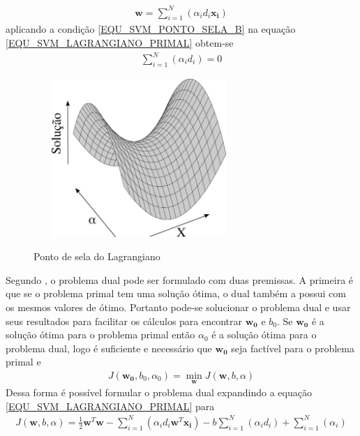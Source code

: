 \begin{align}
\mathbf{w} = \sum\limits_{i = 1}^{N} \left( \alpha_{i}d_{i}\mathbf{x_{i}} \right) \label{EQU_SVM_PONTO_SELA_W_RESTRICAO_OBTIDA}
\end{align}
aplicando a condição \eqref{EQU_SVM_PONTO_SELA_B} na equação \eqref{EQU_SVM_LAGRANGIANO_PRIMAL} obtem-se 
\begin{align}
\sum\limits_{i=1}^{N} \left( \alpha_{i}d_{i} \right) = 0 \label{EQU_SVM_PONTO_SELA_B_RESTRICAO_OBTIDA}
\end{align}
\begin{figure}[hbt]
  \centering
  \caption{Ponto de sela do Lagrangiano}
  \includegraphics[width=8cm,height=6cm]{./secoes/conceitosFundamentais/pics/img/Rplot.eps}
  \label{FIGURA_SVM_PONTO_DE_SELA}
  \vspace{0.1cm}
\end{figure}
\noindent
Segundo , o problema dual pode ser formulado com duas premissas. A primeira é que se o problema primal tem uma solução ótima, o dual também a possui com os mesmos valores de ótimo. Portanto pode-se solucionar o problema dual e usar seus resultados para facilitar os cálculos para encontrar \(\mathbf{w_{0}}\) e \(b_{0}\). Se \(\mathbf{w_{0}}\) é a solução ótima para o problema primal então \(\alpha_{0}\) é a solução ótima para o problema dual, logo é suficiente e necessário que \(\mathbf{w_{0}}\) seja factível para o problema primal e
\begin{align}
J(\mathbf{w_{0}}, b_{0}, \alpha_{0}) = \min_{\mathbf{w}} J(\mathbf{w}, b, \alpha)
\end{align}
Dessa forma é possível formular o problema dual expandindo a equação \eqref{EQU_SVM_LAGRANGIANO_PRIMAL} para
\begin{align}
J(\mathbf{w}, b, \alpha) = \frac{1}{2}\mathbf{w}^{T}\mathbf{w} - \sum\limits_{i=1}^{N} \left( \alpha_{i}d_{i}\mathbf{w}^{T}\mathbf{x_{i}} \right) - b\sum\limits_{i=1}^{N} \left( \alpha_{i}d_{i} \right) + \sum\limits_{i=1}^{N}  \left( \alpha_{i} \right) \label{EQU_SVM_LAGRANGIANO_PRIMAL_EXPANDIDO}
\end{align}
